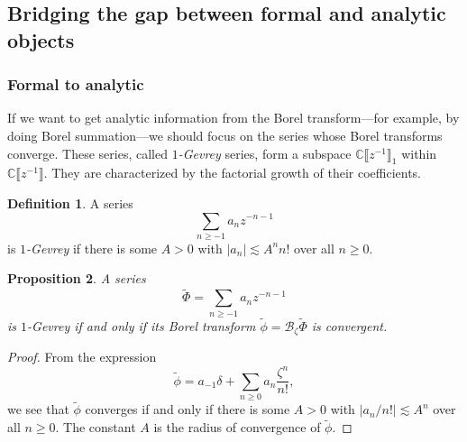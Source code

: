 \documentclass{article}
\newcommand{\C}{\mathbb{C}}
\newcommand{\series}[1]{\tilde{#1}}
\newcommand{\borel}{\mathcal{B}}
\theoremstyle{definition}
\newtheorem{definition}{Definition}[section]
\theoremstyle{plain}
\newtheorem{prop}[definition]{Proposition}
\begin{document}
\subsection{Bridging the gap between formal and analytic objects}\label{sec:bridging}
%
%
\subsubsection{Formal to analytic}\label{sec:Borel-gevrey}
%
If we want to get analytic information from the Borel transform---for example, by doing Borel summation---we should focus on the series whose Borel transforms converge. These series, called {\em $1$-Gevrey} series, form a subspace $\C \llbracket z^{-1} \rrbracket_1$ within $\C \llbracket z^{-1} \rrbracket$. They are characterized by the factorial growth of their coefficients.
\begin{definition}
A series
\[ \sum_{n \ge -1} a_n z^{-n-1} \]
is {\em $1$-Gevrey} if there is some $A > 0$ with $|a_n| \lesssim A^n n!$ over all $n \ge 0$.
\end{definition}
\begin{prop}\label{prop:gevrey_to_convergent}
A series
\[ \series{\Phi} = \sum_{n \ge -1} a_n z^{-n-1} \]
is $1$-Gevrey if and only if its Borel transform $\series{\phi} = \borel_\zeta \series{\Phi}$ is convergent.
\end{prop}
\begin{proof}
From the expression
\[ \series{\phi} = a_{-1} \delta + \sum_{n \ge 0} a_n \frac{\zeta^n}{n!}, \]
we see that $\series{\phi}$ converges if and only if there is some $A > 0$ with $|a_n / n!| \lesssim A^n$ over all $n \ge 0$. The constant $A$ is the radius of convergence of $\series{\phi}$.
\end{proof}
\end{document}
